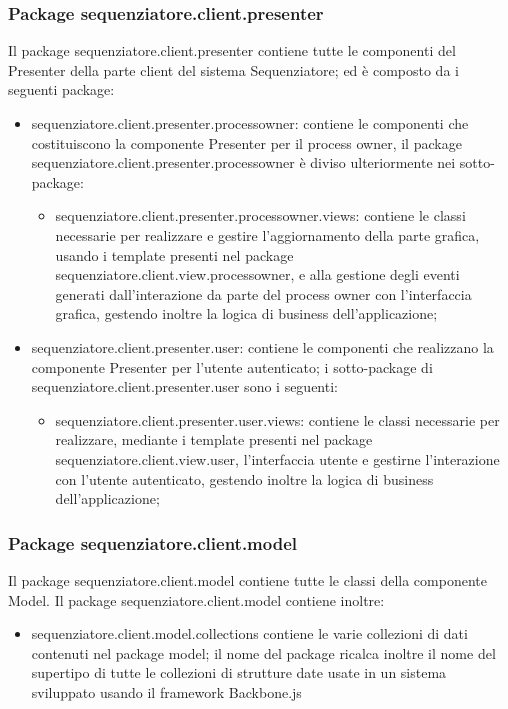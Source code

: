 \subsubsection{Package sequenziatore.client.presenter}
Il package sequenziatore.client.presenter contiene tutte le componenti del Presenter della parte client del sistema Sequenziatore; ed è composto da i seguenti package:
\begin{itemize}
	\item sequenziatore.client.presenter.processowner: contiene le componenti che costituiscono la componente Presenter
per il process owner, il package sequenziatore.client.presenter.processowner è diviso ulteriormente nei sotto-package:
	\begin{itemize}
		\item sequenziatore.client.presenter.processowner.views: contiene le classi necessarie per realizzare e gestire l'aggiornamento della parte grafica, usando i template presenti nel package sequenziatore.client.view.processowner, e alla gestione degli eventi generati dall'interazione da parte del process owner con l'interfaccia grafica, gestendo inoltre la logica di business dell'applicazione;
	\end{itemize}
	\item sequenziatore.client.presenter.user: contiene le componenti che realizzano la componente Presenter per l'utente autenticato; i sotto-package di sequenziatore.client.presenter.user sono i seguenti:
	\begin{itemize}
		\item sequenziatore.client.presenter.user.views: contiene le classi necessarie per realizzare, mediante i template presenti nel package sequenziatore.client.view.user, l'interfaccia utente e gestirne l'interazione con l'utente autenticato, gestendo inoltre la logica di business dell'applicazione;
	\end{itemize}
\end{itemize}
\subsubsection{Package sequenziatore.client.model}
Il package sequenziatore.client.model contiene tutte le classi della componente Model. 
Il package sequenziatore.client.model contiene inoltre:
\begin{itemize}
	\item sequenziatore.client.model.collections contiene le varie collezioni di dati contenuti nel package model; il nome del package ricalca inoltre il nome del supertipo di tutte le collezioni di strutture date usate in un sistema sviluppato usando il framework Backbone.js
\end{itemize}

